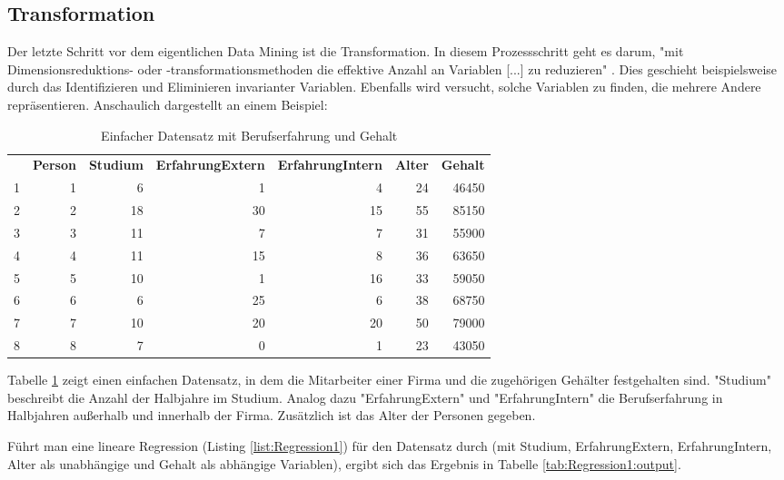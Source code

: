 \subsection{Transformation}
Der letzte Schritt vor dem eigentlichen Data Mining ist die Transformation. In diesem Prozessschritt geht es darum, "mit Dimensionsreduktions- oder -transformationsmethoden die effektive Anzahl an Variablen [...] zu reduzieren" \citep[S.~42; eigene Übersetzung]{fayyad_data_1996}. Dies geschieht beispielsweise durch das Identifizieren und Eliminieren invarianter Variablen. Ebenfalls wird versucht, solche Variablen zu finden, die mehrere Andere repräsentieren. Anschaulich dargestellt an einem Beispiel:\par
\begin{table}[H] \centering
\begin{tabular}{|r|r|r|r|r|r|r|}
  \hline
 & \textbf{Person} & \textbf{Studium} & \textbf{ErfahrungExtern} & \textbf{ErfahrungIntern} & \textbf{Alter} & \textbf{Gehalt} \\ 
\hhline{=======}
1 &   1 &   6 &   1 &   4 &  24 & 46450 \\ 
  2 &   2 &  18 &  30 &  15 &  55 & 85150 \\ 
  3 &   3 &  11 &   7 &   7 &  31 & 55900 \\ 
  4 &   4 &  11 &  15 &   8 &  36 & 63650 \\ 
  5 &   5 &  10 &   1 &  16 &  33 & 59050 \\ 
  6 &   6 &   6 &  25 &   6 &  38 & 68750 \\ 
  7 &   7 &  10 &  20 &  20 &  50 & 79000 \\ 
  8 &   8 &   7 &   0 &   1 &  23 & 43050 \\ 
   \hline
\end{tabular}
\caption{Einfacher Datensatz mit Berufserfahrung und Gehalt}
\label{tab:Beispiel_Berufserfahrung_R_output_simpleData}
\end{table}
Tabelle \ref{tab:Beispiel_Berufserfahrung_R_output_simpleData} zeigt einen einfachen Datensatz, in dem die Mitarbeiter einer Firma und die zugehörigen Gehälter festgehalten sind. "Studium" beschreibt die Anzahl der Halbjahre im Studium. Analog dazu "ErfahrungExtern" und "ErfahrungIntern" die Berufserfahrung in Halbjahren außerhalb und innerhalb der Firma. Zusätzlich ist das Alter der Personen gegeben.\par
Führt man eine lineare Regression (Listing \ref{list:Regression1}) für den Datensatz durch (mit Studium, ErfahrungExtern, ErfahrungIntern, Alter als unabhängige und Gehalt als abhängige Variablen), ergibt sich das Ergebnis in Tabelle \ref{tab:Regression1:output}.

